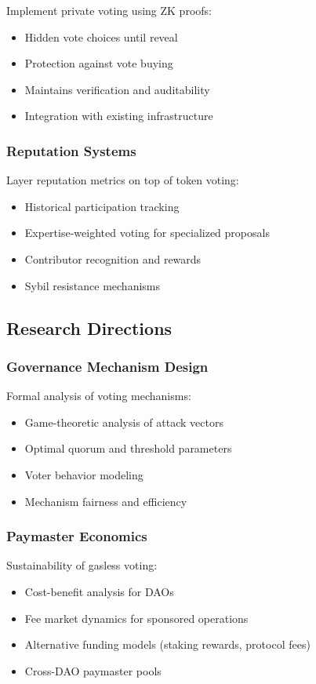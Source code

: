 Implement private voting using ZK proofs:
\begin{itemize}
    \item Hidden vote choices until reveal
    \item Protection against vote buying
    \item Maintains verification and auditability
    \item Integration with existing infrastructure
\end{itemize}

\subsubsection{Reputation Systems}

Layer reputation metrics on top of token voting:
\begin{itemize}
    \item Historical participation tracking
    \item Expertise-weighted voting for specialized proposals
    \item Contributor recognition and rewards
    \item Sybil resistance mechanisms
\end{itemize}

\subsection{Research Directions}

\subsubsection{Governance Mechanism Design}

Formal analysis of voting mechanisms:
\begin{itemize}
    \item Game-theoretic analysis of attack vectors
    \item Optimal quorum and threshold parameters
    \item Voter behavior modeling
    \item Mechanism fairness and efficiency
\end{itemize}

\subsubsection{Paymaster Economics}

Sustainability of gasless voting:
\begin{itemize}
    \item Cost-benefit analysis for DAOs
    \item Fee market dynamics for sponsored operations
    \item Alternative funding models (staking rewards, protocol fees)
    \item Cross-DAO paymaster pools
\end{itemize}

